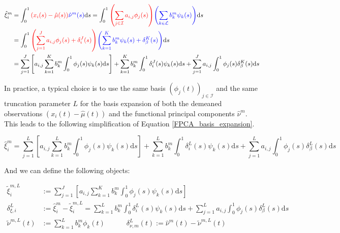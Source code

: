\documentclass[11pt,twoside,a4paper]{article}
\begin{document}
	\begin{equation}\label{FPCA_basis_expansion}
		\begin{split}
			\hat{\xi}_{i}^m & = \int_{0}^{1} {\color{red}\left( x_i(s) - \hat{\mu}(s)\right)} {\color{blue}\hat{\nu}^m(s)} \mathrm{d}s
			= \int_{0}^{1} {\color{red}\left(\sum_{j \in \mathcal{I}} a_{i,j} \phi_j(s)\right)} {\color{blue}\left(\sum_{k \in \mathcal{L}} b_{k}^m \psi_{k}(s)\right)} \mathrm{d}s \\
			& = \int_{0}^{1} {\color{red}\left(\sum_{j = 1}^{J} a_{i,j} \phi_j(s) + \delta_i^J(s)\right)} {\color{blue}\left(\sum_{k = 1}^{K} b_{k}^m \psi_{k}(s) + \delta_{\beta}^K(s)\right)} \mathrm{d}s \\
			& = \sum_{j = 1}^{J} \left[a_{i,j}\sum_{k = 1}^{K} b_{k}^m \int_{0}^{1} \phi_j(s) \psi_{k}(s)\mathrm{d}s \right] +  \sum_{k = 1}^{K} b_{k}^m \int_{0}^{1} \delta_i^J(s) \psi_{k}(s) \mathrm{d}s + \sum_{j = 1}^{J} a_{i,j} \int_{0}^{1}\phi_j(s) \delta_{\beta}^K(s) \mathrm{d}s
		\end{split}
	\end{equation}
	
	In practice, a typical choice is to use the same basis $\left(\phi_j(t)\right)_{j \in \mathcal{I}}$ and the same truncation parameter $L$ for the basis expansion of both the demeaned observations $\left(x_i(t) - \hat{\mu}(t)\right)$ and the functional principal components $\hat{\nu}^m$. This leads to the following simplification of Equation \ref{FPCA_basis_expansion}.
	
	\begin{equation}\label{score_approx}
			\hat{\xi}_{i}^m = \sum_{j = 1}^{L} \left[a_{i,j}\sum_{k = 1}^{L} b_{k}^m \int_{0}^{1} \phi_j(s) \psi_{k}(s)\mathrm{d}s \right] +  \sum_{k = 1}^{L} b_{k}^m \int_{0}^{1} \delta_i^L(s) \psi_{k}(s) \mathrm{d}s + \sum_{j = 1}^{L} a_{i,j} \int_{0}^{1}\phi_j(s) \delta_{\beta}^L(s) \mathrm{d}s
	\end{equation}

	And we can define the following objects:
	
	\begin{equation}
		\begin{split}
			\tilde{\xi}^{m,L}_{i} & := \sum_{j = 1}^{J} \left[a_{i,j}\sum_{k = 1}^{K} b_{k}^m \int_{0}^{1} \phi_j(s) \psi_{k}(s)\mathrm{d}s \right] \\
			\delta_{\xi, i}^L & := \hat{\xi}_{i}^m - \tilde{\xi}^{m,L}_{i} = \sum_{k = 1}^{L} b_{k}^m \int_{0}^{1} \delta_i^L(s) \psi_{k}(s) \mathrm{d}s + \sum_{j = 1}^{L} a_{i,j} \int_{0}^{1}\phi_j(s) \delta_{\beta}^L(s) \mathrm{d}s \\
			\tilde{\nu}^{m,L}(t) & := \sum_{k = 1}^{L} b_{k}^m \phi_{k}(t) \quad \quad \quad
			\delta_{\nu, m}^L(t) := \hat{\nu}^m(t) - \tilde{\nu}^{m,L}(t)
		\end{split}
	\end{equation}
	
\end{document}
